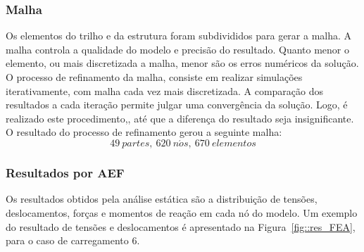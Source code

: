 \subsubsection{Malha}

Os elementos do trilho e da estrutura foram subdivididos para gerar a malha. A
malha controla a qualidade do modelo e precisão do resultado.
Quanto menor o elemento, ou mais discretizada a malha, menor são os erros
numéricos da solução. O processo de refinamento da malha, consiste em realizar
simulações iterativamente, com malha cada vez mais discretizada. A comparação
dos resultados a cada iteração permite julgar uma convergência da solução. Logo,
é realizado este procedimento,, até que a diferença do resultado seja
insignificante. O resultado do processo de refinamento gerou a seguinte
malha:
%
$$ 49~partes,~ 620~n\acute{o}s,~ 670~elementos $$
%

\subsubsection{Resultados por AEF}

Os resultados obtidos pela análise estática são a distribuição de tensões,
deslocamentos, forças e momentos de reação em cada nó do modelo. Um exemplo do
resultado de tensões e deslocamentos é apresentado na Figura~\ref{fig::res_FEA},
para o caso de carregamento 6.

